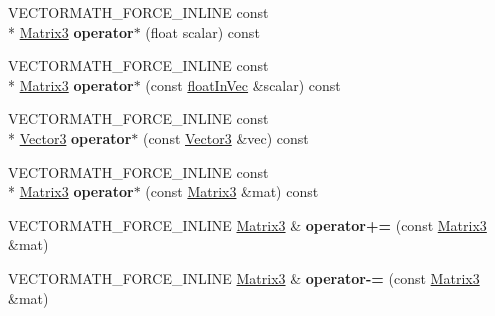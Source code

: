 \begin{DoxyCompactItemize}
\item 
\hypertarget{class_vectormath_1_1_aos_1_1_matrix3_ac8faf3586a23ce9160bd5839b7725db8}{V\+E\+C\+T\+O\+R\+M\+A\+T\+H\+\_\+\+F\+O\+R\+C\+E\+\_\+\+I\+N\+L\+I\+N\+E const \\*
\hyperlink{class_vectormath_1_1_aos_1_1_matrix3}{Matrix3} {\bfseries operator$\ast$} (float scalar) const }\label{class_vectormath_1_1_aos_1_1_matrix3_ac8faf3586a23ce9160bd5839b7725db8}

\item 
\hypertarget{class_vectormath_1_1_aos_1_1_matrix3_a8529173505f96097078c3b5ced86270d}{V\+E\+C\+T\+O\+R\+M\+A\+T\+H\+\_\+\+F\+O\+R\+C\+E\+\_\+\+I\+N\+L\+I\+N\+E const \\*
\hyperlink{class_vectormath_1_1_aos_1_1_matrix3}{Matrix3} {\bfseries operator$\ast$} (const \hyperlink{class_vectormath_1_1float_in_vec}{float\+In\+Vec} \&scalar) const }\label{class_vectormath_1_1_aos_1_1_matrix3_a8529173505f96097078c3b5ced86270d}

\item 
\hypertarget{class_vectormath_1_1_aos_1_1_matrix3_a795e8f7ef4e494eb96cd8c1838af4c5f}{V\+E\+C\+T\+O\+R\+M\+A\+T\+H\+\_\+\+F\+O\+R\+C\+E\+\_\+\+I\+N\+L\+I\+N\+E const \\*
\hyperlink{class_vectormath_1_1_aos_1_1_vector3}{Vector3} {\bfseries operator$\ast$} (const \hyperlink{class_vectormath_1_1_aos_1_1_vector3}{Vector3} \&vec) const }\label{class_vectormath_1_1_aos_1_1_matrix3_a795e8f7ef4e494eb96cd8c1838af4c5f}

\item 
\hypertarget{class_vectormath_1_1_aos_1_1_matrix3_ac38e6e42fe4f5230c00dcef4e8cb7fe3}{V\+E\+C\+T\+O\+R\+M\+A\+T\+H\+\_\+\+F\+O\+R\+C\+E\+\_\+\+I\+N\+L\+I\+N\+E const \\*
\hyperlink{class_vectormath_1_1_aos_1_1_matrix3}{Matrix3} {\bfseries operator$\ast$} (const \hyperlink{class_vectormath_1_1_aos_1_1_matrix3}{Matrix3} \&mat) const }\label{class_vectormath_1_1_aos_1_1_matrix3_ac38e6e42fe4f5230c00dcef4e8cb7fe3}

\item 
\hypertarget{class_vectormath_1_1_aos_1_1_matrix3_a1b9b7766e7b99453297660db121c5af7}{V\+E\+C\+T\+O\+R\+M\+A\+T\+H\+\_\+\+F\+O\+R\+C\+E\+\_\+\+I\+N\+L\+I\+N\+E \hyperlink{class_vectormath_1_1_aos_1_1_matrix3}{Matrix3} \& {\bfseries operator+=} (const \hyperlink{class_vectormath_1_1_aos_1_1_matrix3}{Matrix3} \&mat)}\label{class_vectormath_1_1_aos_1_1_matrix3_a1b9b7766e7b99453297660db121c5af7}

\item 
\hypertarget{class_vectormath_1_1_aos_1_1_matrix3_a89abdf48eecd9bbcb786282ce3f89225}{V\+E\+C\+T\+O\+R\+M\+A\+T\+H\+\_\+\+F\+O\+R\+C\+E\+\_\+\+I\+N\+L\+I\+N\+E \hyperlink{class_vectormath_1_1_aos_1_1_matrix3}{Matrix3} \& {\bfseries operator-\/=} (const \hyperlink{class_vectormath_1_1_aos_1_1_matrix3}{Matrix3} \&mat)}\label{class_vectormath_1_1_aos_1_1_matrix3_a89abdf48eecd9bbcb786282ce3f89225}


\end{DoxyCompactItemize}
